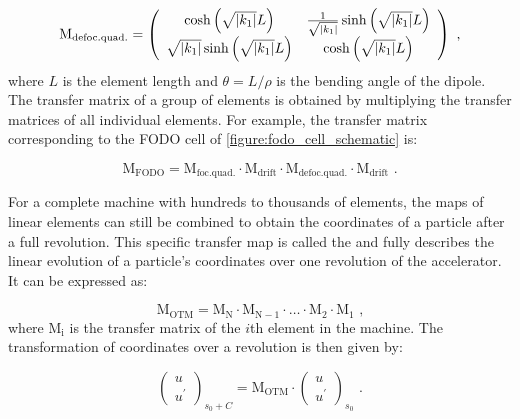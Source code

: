 \begin{equation}
    \mathrm{M_{defoc. quad.}} = \left(
        \begin{array}{cc}
            \cosh \left( \sqrt{\left\lvert k_1 \right\rvert} L \right)                 & \frac{1}{\sqrt{\left\lvert k_1 \right\rvert}} \sinh \left( \sqrt{\left\lvert k_1 \right\rvert} L \right) \\
            \sqrt{\left\lvert k_1 \right\rvert} \sinh \left( \sqrt{\left\lvert k_1 \right\rvert} L \right) & \cosh \left( \sqrt{\left\lvert k_1 \right\rvert} L \right)
    \end{array} \right) \text{ ,}
    \label{equation:defocusing_quad_transfer_matrix}
\end{equation}
where \(L\) is the element length and \(\theta = L / \rho\) is the bending angle of the dipole.
The transfer matrix of a group of elements is obtained by multiplying the transfer matrices of all individual elements.
For example, the transfer matrix corresponding to the FODO cell of \cref{figure:fodo_cell_schematic} is:

\begin{equation}
    \mathrm{M_{FODO}} = \mathrm{M_{foc. quad.}} \cdot \mathrm{M_{drift}} \cdot \mathrm{M_{defoc. quad.}} \cdot \mathrm{M_{drift}} \text{ .}
    \label{equation:fodo_transfer_matrix}
\end{equation}

For a complete machine with hundreds to thousands of elements, the maps of linear elements can still be combined to obtain the coordinates of a particle after a full revolution.
This specific transfer map is called the  and fully describes the linear evolution of a particle's coordinates over one revolution of the accelerator.
It can be expressed as:

\begin{equation}
    \mathrm{M_{OTM}} = \mathrm{M_N} \cdot \mathrm{M_{N-1}} \cdot \ldots \cdot \mathrm{M_2} \cdot \mathrm{M_1} \text{ ,}
    \label{equation:one_turn_map}
\end{equation}
where \(\mathrm{M_i}\) is the transfer matrix of the \(i\)th element in the machine.
The transformation of coordinates over a revolution is then given by:

\begin{equation}
    \left(
        \begin{array}{c}
            u \\
            u^{\prime}
        \end{array} \right)_{s_0 + C} = \mathrm{M_{OTM}} \cdot \left( 
        \begin{array}{c}
            u \\
            u^{\prime}
    \end{array} \right)_{s_0} \text{ .}
    \label{equation:one_turn_coordinates_transformation}
\end{equation}

